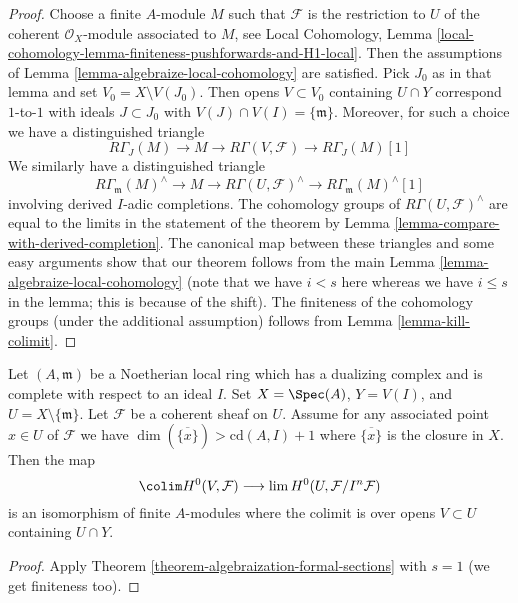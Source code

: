 \begin{proof}
Choose a finite $A$-module $M$ such that $\mathcal{F}$ is the
restriction to $U$ of the
coherent $\mathcal{O}_X$-module associated to $M$, see Local Cohomology,
Lemma \ref{local-cohomology-lemma-finiteness-pushforwards-and-H1-local}.
Then the assumptions of
Lemma \ref{lemma-algebraize-local-cohomology}
are satisfied.
Pick $J_0$ as in that lemma and set $V_0 = X \setminus V(J_0)$.
Then opens $V \subset V_0$ containing $U \cap Y$
correspond $1$-to-$1$ with ideals $J \subset J_0$ with
$V(J) \cap V(I) = \{\mathfrak m\}$.
Moreover, for such a choice we have a distinguished triangle
$$
R\Gamma_J(M) \to M \to R\Gamma(V, \mathcal{F}) \to
R\Gamma_J(M)[1]
$$
We similarly have a distinguished triangle
$$
R\Gamma_\mathfrak m(M)^\wedge \to
M \to
R\Gamma(U, \mathcal{F})^\wedge \to
R\Gamma_\mathfrak m(M)^\wedge[1]
$$
involving derived $I$-adic completions.
The cohomology groups of $R\Gamma(U, \mathcal{F})^\wedge$ are
equal to the limits in the statement of the theorem by
Lemma \ref{lemma-compare-with-derived-completion}.
The canonical map between these triangles
and some easy arguments show that our
theorem follows from the main Lemma \ref{lemma-algebraize-local-cohomology}
(note that we have $i < s$ here whereas we have
$i \leq s$ in the lemma; this is because of the shift).
The finiteness of the cohomology groups
(under the additional assumption) follows from
Lemma \ref{lemma-kill-colimit}.
\end{proof}

\begin{lemma}
\label{lemma-application-theorem}
Let $(A, \mathfrak m)$ be a Noetherian local ring which has a
dualizing complex and is complete with respect to an ideal $I$.
Set $X = \Spec(A)$, $Y = V(I)$, and $U = X \setminus \{\mathfrak m\}$.
Let $\mathcal{F}$ be a coherent sheaf on $U$.
Assume for any associated point $x \in U$ of $\mathcal{F}$
we have $\dim(\overline{\{x\}}) > \text{cd}(A, I) + 1$
where $\overline{\{x\}}$ is the closure in $X$.
Then the map
$$
\colim H^0(V, \mathcal{F})
\longrightarrow
\lim H^0(U, \mathcal{F}/I^n\mathcal{F})
$$
is an isomorphism of finite $A$-modules
where the colimit is over opens $V \subset U$
containing $U \cap Y$.
\end{lemma}

\begin{proof}
Apply Theorem \ref{theorem-algebraization-formal-sections} with $s = 1$
(we get finiteness too).
\end{proof}




